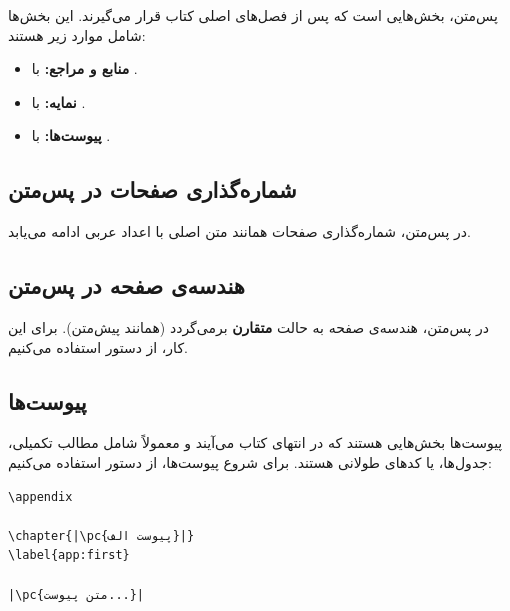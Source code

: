 پس‌متن، بخش‌هایی است که پس از فصل‌های اصلی
کتاب قرار می‌گیرند. این بخش‌ها شامل موارد زیر
هستند:

\begin{itemize}
    \item \textbf{منابع و مراجع:} با
    .
    \item \textbf{نمایه:} با .
    \item \textbf{پیوست‌ها:} با .
\end{itemize}

\subsection{شماره‌گذاری صفحات در پس‌متن}
\label{sec:book-structure-backmatter-numbering}

در پس‌متن، شماره‌گذاری صفحات همانند متن اصلی
با اعداد عربی ادامه می‌یابد.

\subsection{هندسه‌ی صفحه در پس‌متن}
\label{sec:book-structure-backmatter-geometry}

در پس‌متن، هندسه‌ی صفحه به حالت \textbf{متقارن}
برمی‌گردد (همانند پیش‌متن). برای این کار، از
دستور  استفاده می‌کنیم.


\subsection{پیوست‌ها}
\label{sec:book-structure-appendices}

پیوست‌ها بخش‌هایی هستند که در انتهای کتاب
می‌آیند و معمولاً شامل مطالب تکمیلی، جدول‌ها،
یا کدهای طولانی هستند. برای شروع پیوست‌ها،
از دستور  استفاده می‌کنیم:

\begin{latin}
\begin{verbatim}
\appendix

\chapter{|\pc{پیوست الف}|}
\label{app:first}

|\pc{متن پیوست...}|
\end{verbatim}
\end{latin}

